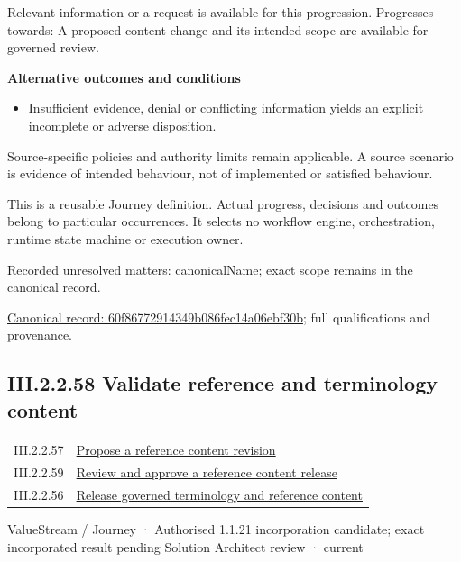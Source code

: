 Relevant information or a request is available for this progression. Progresses towards: A proposed content change and its intended scope are available for governed review.



\par\medskip\textbf{Alternative outcomes and conditions}\par


\begin{itemize}


\item Insufficient evidence, denial or conflicting information yields an explicit incomplete or adverse disposition.

\end{itemize}


Source-specific policies and authority limits remain applicable. A source scenario is evidence of intended behaviour, not of implemented or satisfied behaviour.



This is a reusable Journey definition. Actual progress, decisions and outcomes belong to particular occurrences. It selects no workflow engine, orchestration, runtime state machine or execution owner.


{\small Recorded unresolved matters: canonicalName; exact scope remains in the canonical record.}\par
{\footnotesize \href{../../../../../../../continuum/strategy/value-stream/60f86772914349b086fec14a06ebf30b.md}{Canonical record: 60f86772914349b086fec14a06ebf30b}; full qualifications and provenance.}\par
\subsection*{III.2.2.58 Validate reference and terminology content}
\label{navigation:III.2.2.58}

\begin{longtable}{p{.22\linewidth}p{.73\linewidth}}
III.2.2.57 & \hyperref[element:60f86772914349b086fec14a06ebf30b]{Propose a reference content revision} \\
III.2.2.59 & \hyperref[element:cdca249dbbef4d798219d4732bd8e74f]{Review and approve a reference content release} \\
III.2.2.56 & \hyperref[element:e9a8a77c5f9c4361af4dfcfa607ece2d]{Release governed terminology and reference content} \\
\end{longtable}
\label{element:6e6c29788acd49ab87f918476d7a3de0}
{\small ValueStream / Journey · Authorised 1.1.21 incorporation candidate; exact incorporated result pending Solution Architect review · current}\par

